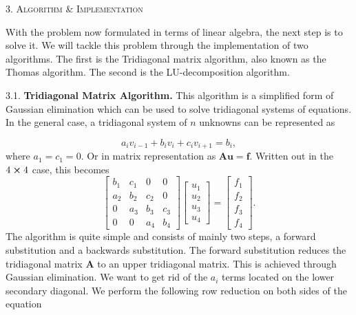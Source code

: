 \documentclass[a4paper,10pt]{article}
\begin{document}
\bigskip

\begin{center}
\textsc{3. Algorithm \& Implementation }
\end{center}
With the problem now formulated in terms of linear algebra, the next step is to solve it. We will tackle this problem through the implementation of two algorithms. The first is the Tridiagonal matrix algorithm, also known as the Thomas algorithm. The second is the LU-decomposition algorithm. 
\bigskip

3.1. \textbf{Tridiagonal Matrix Algorithm.} This algorithm is a simplified form of Gaussian elimination which can be used to solve tridiagonal systems of equations. In the general case, a tridiagonal system of $n$ unknowns can be represented as 

\begin{equation}
a_i v_{i-1} + b_i v_i +c_i v_{i+1} = b_i,
\end{equation}
where $a_1 = c_1 = 0$. Or in matrix representation as $\textbf{A} \mathbf{u} = \mathbf{f}$. Written out in the $4 \cross 4$ case, this becomes
\begin{equation}
\begin{bmatrix}
b_1 & c_1 & 0 & 0 \\
a_2& b_2 & c_2 & 0 \\
0 & a_3 & b_3 & c_3 \\
0 & 0 & a_4 & b_4 
\end{bmatrix}
\begin{bmatrix}
u_1 \\
u_2 \\
u_3 \\
u_4
\end{bmatrix}
=
\begin{bmatrix}
f_1\\
f_2\\
f_3\\
f_4
\end{bmatrix}.
\end{equation}
The algorithm is quite simple and consists of mainly two steps, a forward substitution and a backwards substitution. The forward substitution reduces the tridiagonal matrix $\textbf{A}$ to an upper tridiagonal matrix. This is achieved through Gaussian elimination. We want to get rid of the $a_i$ terms located on the lower secondary diagonal. We perform the following row reduction on both sides of the equation
\end{document}
